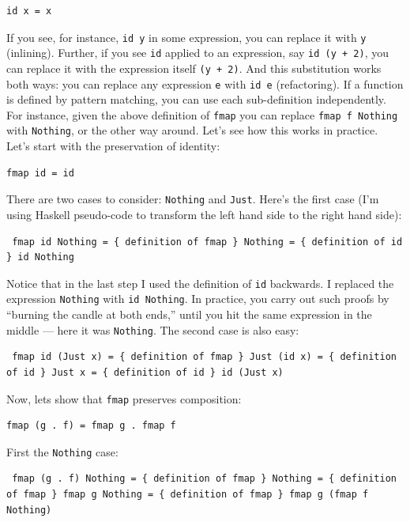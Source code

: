 \begin{verbatim}
id x = x
\end{verbatim}

If you see, for instance, \texttt{id\ y} in some expression, you can
replace it with \texttt{y} (inlining). Further, if you see \texttt{id}
applied to an expression, say \texttt{id\ (y\ +\ 2)}, you can replace it
with the expression itself \texttt{(y\ +\ 2)}. And this substitution
works both ways: you can replace any expression \texttt{e} with
\texttt{id\ e} (refactoring). If a function is defined by pattern
matching, you can use each sub-definition independently. For instance,
given the above definition of \texttt{fmap} you can replace
\texttt{fmap\ f\ Nothing} with \texttt{Nothing}, or the other way
around. Let's see how this works in practice. Let's start with the
preservation of identity:

\begin{verbatim}
fmap id = id
\end{verbatim}

There are two cases to consider: \texttt{Nothing} and \texttt{Just}.
Here's the first case (I'm using Haskell pseudo-code to transform the
left hand side to the right hand side):

\begin{verbatim}
 fmap id Nothing = { definition of fmap } Nothing = { definition of id } id Nothing
\end{verbatim}

Notice that in the last step I used the definition of \texttt{id}
backwards. I replaced the expression \texttt{Nothing} with
\texttt{id\ Nothing}. In practice, you carry out such proofs by
``burning the candle at both ends,'' until you hit the same expression
in the middle --- here it was \texttt{Nothing}. The second case is also
easy:

\begin{verbatim}
 fmap id (Just x) = { definition of fmap } Just (id x) = { definition of id } Just x = { definition of id } id (Just x)
\end{verbatim}

Now, lets show that \texttt{fmap} preserves composition:

\begin{verbatim}
fmap (g . f) = fmap g . fmap f
\end{verbatim}

First the \texttt{Nothing} case:

\begin{verbatim}
 fmap (g . f) Nothing = { definition of fmap } Nothing = { definition of fmap } fmap g Nothing = { definition of fmap } fmap g (fmap f Nothing)
\end{verbatim}

